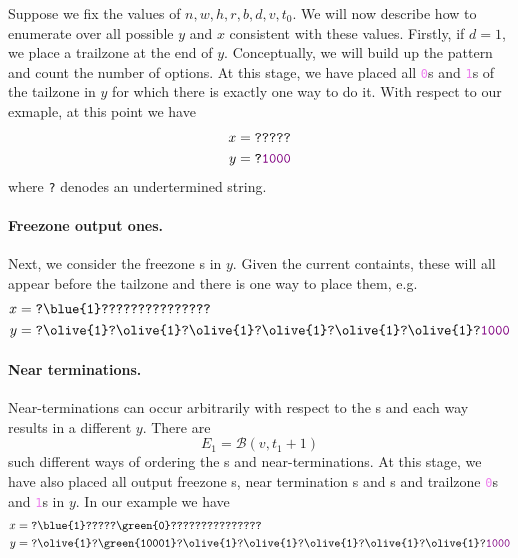 \noindent Suppose we fix the values of $n,w,h,r,b,d,v,t_0$. We will now describe how to enumerate over all possible $y$ and $x$ consistent with these values. Firstly, if $d=1$, we place a trailzone at the end of $y$. Conceptually, we will build up the pattern and count the number of options. At this stage, we have placed all \texttt{\textcolor{violet}{0}}s and \texttt{\textcolor{violet}{1}}s of the tailzone in $y$ for which there is exactly one way to do it. With respect to our exmaple, at this point we have
\begin{align*}
  x&=\texttt{?????}\\
  y&=\texttt{?\textcolor{violet}{1000}}
\end{align*}
where \texttt{?} denodes an undertermined string.

\paragraph{Freezone output ones.}
Next, we consider the freezone \texttt{}s in $y$. Given the current containts, these will all appear before the tailzone and there is one way to place them, e.g.
\begin{align*}
  x&=\texttt{?\blue{1}???????????????}\\
  y&=\texttt{?\olive{1}?\olive{1}?\olive{1}?\olive{1}?\olive{1}?\olive{1}?\textcolor{violet}{1000}}
\end{align*}

\paragraph{Near terminations.} Near-terminations can occur arbitrarily with respect to the \texttt{}s and each way results in a different $y$. There are
$$
E_1=\mathcal{B}(v,t_1+1)
$$
such different ways of ordering the \texttt{}s and near-terminations. At this stage, we have also placed all output freezone \texttt{}s, near termination \texttt{}s and \texttt{}s and trailzone \texttt{\textcolor{violet}{0}}s and \texttt{\textcolor{violet}{1}}s in $y$. In our example we have
\begin{align*}
  x&=\texttt{?\blue{1}?????\green{0}???????????????}\\
  y&=\texttt{?\olive{1}?\green{10001}?\olive{1}?\olive{1}?\olive{1}?\olive{1}?\olive{1}?\textcolor{violet}{1000}}
\end{align*}

